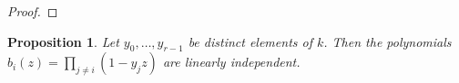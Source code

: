 \documentclass{article}
\numberwithin{equation}{section}
\newtheorem{proposition}[equation]{Proposition}
\begin{document}
\begin{proof}
%
%
%
%

\end{proof}

\begin{proposition}\label{prop:vand}Let $y_0, \ldots, y_{r - 1}$ be distinct elements of $k$.  Then the polynomials $b_i(z) = \prod_{j \neq i} (1 - y_j z)$ are linearly independent.
\end{proposition}
\end{document}
